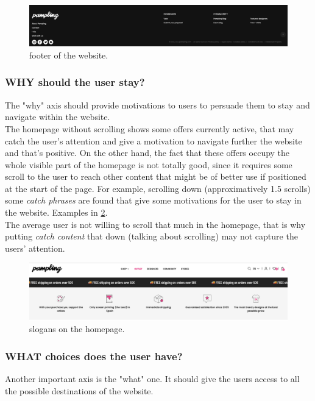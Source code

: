 \begin{figure}[h!]
	\centering
	\includegraphics[scale=0.225]{images/footer.png}
	\caption{footer of the website.}
	\label{fig:footer}
\end{figure}


\subsubsection{WHY should the user stay?} 
The "why" axis should provide motivations to users to persuade them to stay and navigate within the website.\\

The homepage without scrolling shows some offers currently active, that may catch the user's attention and give a motivation to navigate further the website and that's positive.
On the other hand, the fact that these offers occupy the whole visible part of the homepage is not totally good, since it requires some scroll to the user to reach other content
that might be of better use if positioned at the start of the page.
For example, scrolling down (approximatively 1.5 scrolls) some \textit{catch phrases} are found that give some motivations for the user to stay in the website.
Examples in \cref{fig:slogan}.\\
The average user is not willing to scroll that much in the homepage, that is why putting \textit{catch content} that down (talking about scrolling) may not capture the users' attention.

\begin{figure}[h!]
	\centering
	\includegraphics[scale=0.225]{images/slogan.png}
	\caption{slogans on the homepage.}
	\label{fig:slogan}
\end{figure}

\subsubsection{WHAT choices does the user have?} 
Another important axis is the "what" one. It should give the users access to all the possible destinations of the website.\\

